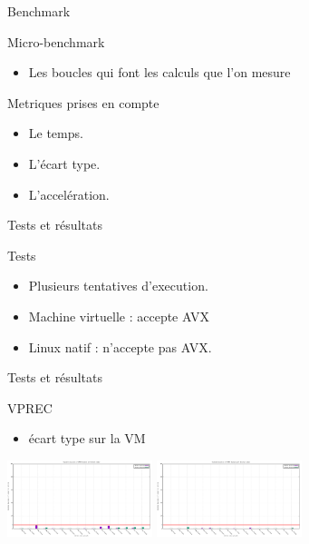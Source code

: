 \documentclass{beamer}
\begin{document}
\begin{frame}{Benchmark}
    \begin{block}{Micro-benchmark}
      \begin{itemize}
          \item Les boucles qui font les calculs que l'on mesure 
          
      \end{itemize}
    \end{block}
  \begin{block}{Metriques prises en compte}
 
        \begin{itemize}

            
            \item Le temps.
            \item L'écart type.
            \item L'accelération.
           
        \end{itemize}
  \end{block}
\end{frame}

\begin{frame}{Tests et résultats}

  \begin{block}{Tests}
 
        \begin{itemize}

            \item Plusieurs tentatives d'execution.
            \item Machine virtuelle : accepte AVX
            \item Linux natif : n'accepte pas AVX.
           
           
        \end{itemize}
  \end{block}
\end{frame}



\begin{frame}{Tests et résultats}
    \begin{block}{VPREC}
    \begin{itemize}
        \item écart type sur la VM 
    \end{itemize}
 \centering\includegraphics[width=160px]{../ressources/vm_vprec_normal_stddev.png}
  \centering\includegraphics[width=160px]{../ressources/vm_vprec_denormal_stddev.png}
    \end{block}
\end{frame}
\end{document}
